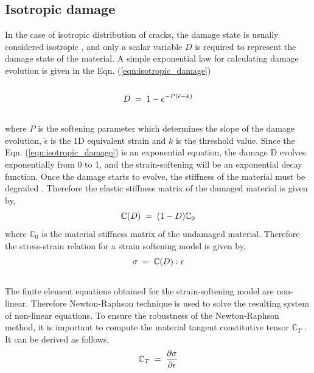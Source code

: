 \documentclass[12pt,openright,twoside]{report}
\begin{document}
\subsection{Isotropic damage}
\indent\indent\indent In the case of isotropic distribution of cracks, the damage state is usually considered isotropic \citep{lemaitre2012course}, and only a scalar variable $D$ is required to represent the damage state of the material. A simple exponential law for calculating damage evolution is given in the Eqn. (\ref{eqn:isotropic_damage}) \citep{peerlings1999enhanced}
\\
\\
\begin{equation}
  \large{ D \; = \; 1 - e^{-P(\tilde{\epsilon} - k)}}
  \label{eqn:isotropic_damage}
\end{equation} 
\\
where $P$ is the softening parameter which determines the slope of the damage evolution, $\tilde{\epsilon}$ is the 1D equivalent strain and $k$ is the threshold value. Since the Eqn. (\ref{eqn:isotropic_damage}) is an exponential equation, the damage D evolves exponentially from 0 to 1, and the strain-softening will be an exponential decay function. Once the damage starts to evolve, the stiffness of the material must be degraded \citep{murakami2012continuum}. Therefore the elastic stiffness matrix of the damaged material is given by,\\
\begin{equation}
\large{\mathbb{C}(D) \; = \; (1  - D) \mathbb{C}_{0} }
\end{equation} 
where $\mathbb{C}_{0}$ is the material stiffness matrix of the undamaged material. Therefore the stress-strain relation for a strain softening model is given by,\\
\begin{equation}
\large{\sigma \; = \; \mathbb{C}(D) : \epsilon }  
\end{equation}
\\
The finite element equations obtained for the strain-softening model are non-linear. Therefore Newton-Raphson technique is used to solve the resulting system of non-linear equations. To ensure the robustness of the Newton-Raphson method, it is important to compute the material tangent constitutive tensor $\mathbb{C}_{T}$ \citep{lapczyk2007progressive}. It can be derived as follows,\\
\begin{equation*}
\large{ \mathbb{C}_{T}  \; = \;\frac{\partial \sigma}{\partial \epsilon}  }
\end{equation*}
\end{document}
